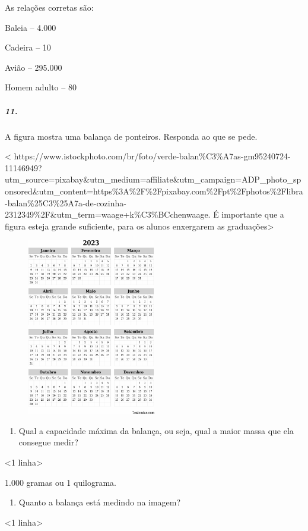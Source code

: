 As relações corretas são:

Baleia -- 4.000

Cadeira -- 10

Avião -- 295.000

Homem adulto -- 80

\subparagraph{11.}\label{section-38}

A figura mostra uma balança de ponteiros. Responda ao que se pede.

\textless{}
https://www.istockphoto.com/br/foto/verde-balan\%C3\%A7as-gm95240724-11146949?utm\_source=pixabay\&utm\_medium=affiliate\&utm\_campaign=ADP\_photo\_sponsored\&utm\_content=https\%3A\%2F\%2Fpixabay.com\%2Fpt\%2Fphotos\%2Flibra-balan\%25C3\%25A7a-de-cozinha-2312349\%2F\&utm\_term=waage+k\%C3\%BCchenwaage.
É importante que a figura esteja grande suficiente, para os alunos
enxergarem as graduações\textgreater{}

\includegraphics[width=3.04167in,height=3.04167in]{media/image52.png}

\begin{enumerate}
\def\labelenumi{\alph{enumi})}
\item
  Qual a capacidade máxima da balança, ou seja, qual a maior massa que ela consegue medir?
\end{enumerate}

\textless{}1 linha\textgreater{}

1.000 gramas ou 1 quilograma.

\begin{enumerate}
\def\labelenumi{\alph{enumi})}
\item
  Quanto a balança está medindo na imagem?
\end{enumerate}

\textless{}1 linha\textgreater{}

